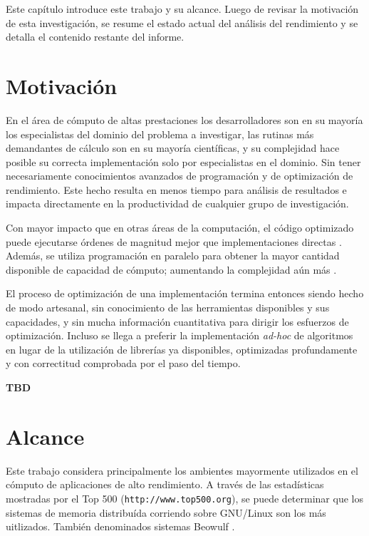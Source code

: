 \documentclass[a4paper]{report}
\begin{document}
Este cap\'itulo introduce este trabajo y su alcance. Luego de revisar la
motivaci\'on de esta investigaci\'on, se resume el estado actual del an\'alisis
del rendimiento y se detalla el contenido restante del informe.

\section{Motivaci\'on}

En el \'area de c\'omputo de altas prestaciones los desarrolladores son en su
mayor\'ia los especialistas del dominio del problema a investigar, las rutinas
m\'as demandantes de c\'alculo son en su mayor\'ia cient\'ificas, y su
complejidad hace posible su correcta implementaci\'on solo por especialistas
en el dominio. Sin tener necesariamente conocimientos avanzados
de programaci\'on y de optimizaci\'on de rendimiento. Este hecho resulta en
menos tiempo para an\'alisis de resultados e impacta directamente en la
productividad de cualquier grupo de investigaci\'on.

\bigskip

Con mayor impacto que en otras \'areas de la computaci\'on, el c\'odigo
optimizado puede ejecutarse \'ordenes de magnitud mejor que implementaciones
directas \cite{mm-matrixmultiplicationtool}. Adem\'as, se utiliza
programaci\'on en paralelo para obtener la mayor cantidad disponible de
capacidad de c\'omputo; aumentando la complejidad a\'un m\'as
\cite{parallel-programming}.

\bigskip

El proceso de optimizaci\'on de una implementaci\'on termina entonces siendo
hecho de modo artesanal, sin conocimiento de las herramientas disponibles y
sus capacidades, y sin mucha informaci\'on cuantitativa para dirigir los
esfuerzos de optimizaci\'on. Incluso se llega a preferir la implementaci\'on
{\em ad-hoc} de algoritmos en lugar de la utilizaci\'on de librer\'ias ya
disponibles, optimizadas profundamente y con correctitud comprobada por el
paso del tiempo.

\bigskip

{\bf TBD}

\section{Alcance}

Este trabajo considera principalmente los ambientes mayormente utilizados en
el c\'omputo de aplicaciones de alto rendimiento. A trav\'es de las
estad\'isticas mostradas por el Top 500 ({\tt http://www.top500.org}), se
puede determinar que los sistemas de memoria distribu\'ida corriendo sobre
GNU/Linux son los m\'as uitlizados. Tambi\'en denominados sistemas Beowulf
\cite{beowulf}.
\end{document}

